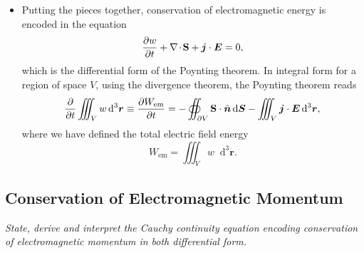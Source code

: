 \documentclass[11pt, a4paper]{article}
\newcommand{\diff}{\mathop{}\!\mathrm{d}} %
\newcommand{\dr}{\diff^{3} \r}  %
\newcommand{\Poy}{Poynting\xspace}
\renewcommand{\vec}[1]{\bm{#1}} %
\newcommand{\uvec}[1]{\hat{\vec{#1}}} %
\renewcommand{\r}{\vec{r}}
\newcommand{\E}{\vec{E}} %
\renewcommand{\S}{\mathbf{S}}  %
\renewcommand{\j}{\vec{j}}  %
\renewcommand{\div}{\nabla \mspace{-2mu} \cdot \mspace{-2mu}}
\begin{document}
\begin{itemize}
	\item Putting the pieces together, conservation of electromagnetic energy is encoded in the equation
	\begin{equation*}
        \pdv{w}{t} + \div \S + \j \cdot \E = 0,
	\end{equation*}
    which is the differential form of the \Poy theorem. In integral form for a region of space $ V $, using the divergence theorem, the \Poy theorem reads
	\begin{equation*}
		\pdv{t}\iiint_{V}w \dr \equiv \pdv{W_{\text{em}}}{t} = - \oiint_{\partial V} \S \cdot \uvec{n} \diff \vec{S} - \iiint_{V} \j \cdot \E \dr,
	\end{equation*}
    where we have defined the total electric field energy
    \begin{equation*}
        W_{\text{em}} = \iiint_{V} w \dr.
    \end{equation*}
    
\end{itemize}

    
\subsection{Conservation of Electromagnetic Momentum}
\textit{State, derive and interpret the Cauchy continuity equation encoding conservation of electromagnetic momentum in both differential form.}
\end{document}
